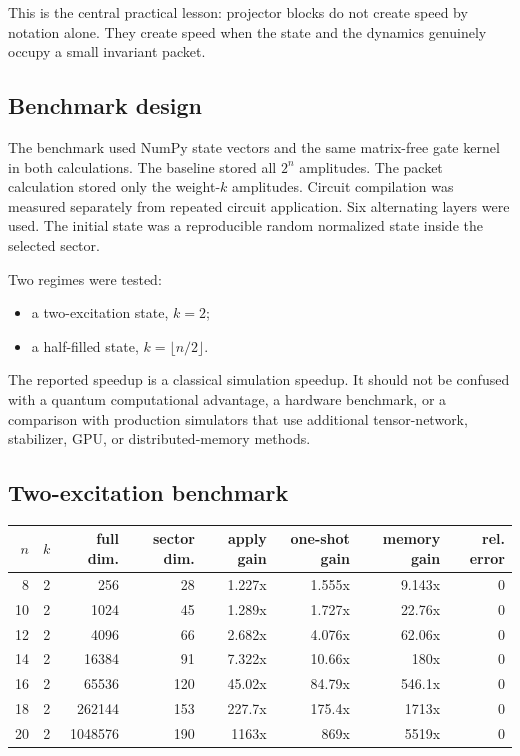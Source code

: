 \documentclass[10pt]{article}
\begin{document}
This is the central practical lesson: projector blocks do not create speed by notation alone.  They create speed when the state and the dynamics genuinely occupy a small invariant packet.

\subsection{Benchmark design}

The benchmark used NumPy state vectors and the same matrix-free gate kernel in both calculations.  The baseline stored all $2^n$ amplitudes.  The packet calculation stored only the weight-$k$ amplitudes.  Circuit compilation was measured separately from repeated circuit application.  Six alternating layers were used.  The initial state was a reproducible random normalized state inside the selected sector.

Two regimes were tested:
\begin{itemize}
\item a two-excitation state, $k=2$;
\item a half-filled state, $k=\lfloor n/2\rfloor$.
\end{itemize}

The reported speedup is a classical simulation speedup.  It should not be confused with a quantum computational advantage, a hardware benchmark, or a comparison with production simulators that use additional tensor-network, stabilizer, GPU, or distributed-memory methods.

\subsection{Two-excitation benchmark}

\begin{center}
\scriptsize
\begin{tabular}{rrrrrrrr}
\toprule
$n$ & $k$ & full dim. & sector dim. & apply gain & one-shot gain & memory gain & rel. error\\
\midrule
8 & 2 & 256 & 28 & 1.227x & 1.555x & 9.143x & 0 \\
10 & 2 & 1024 & 45 & 1.289x & 1.727x & 22.76x & 0 \\
12 & 2 & 4096 & 66 & 2.682x & 4.076x & 62.06x & 0 \\
14 & 2 & 16384 & 91 & 7.322x & 10.66x & 180x & 0 \\
16 & 2 & 65536 & 120 & 45.02x & 84.79x & 546.1x & 0 \\
18 & 2 & 262144 & 153 & 227.7x & 175.4x & 1713x & 0 \\
20 & 2 & 1048576 & 190 & 1163x & 869x & 5519x & 0 \\
\bottomrule
\end{tabular}
\end{center}
\end{document}
